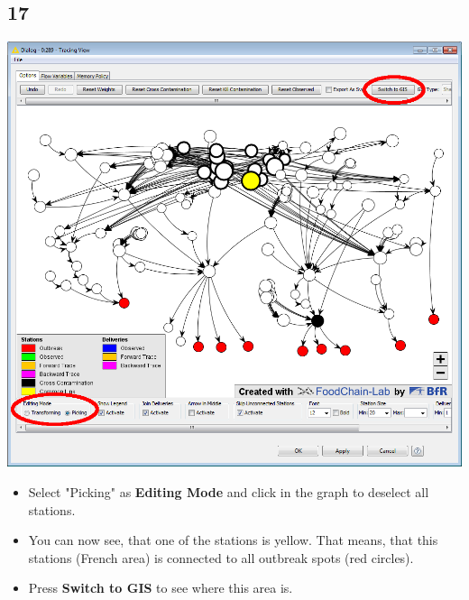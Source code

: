 \documentclass{beamer}
\begin{document}
\subsection{17}
\begin{frame}
	\begin{center}
  		\includegraphics[height=0.6\textheight]{17.png}
	\end{center}
	\begin{itemize}
		\item Select "Picking" as \textbf{Editing Mode} and click in the graph to deselect all stations.
		\item You can now see, that one of the stations is yellow. That means, that this stations (French area) is connected to all outbreak spots (red circles).
		\item Press \textbf{Switch to GIS} to see where this area is.
	\end{itemize}
\end{frame}
\end{document}
